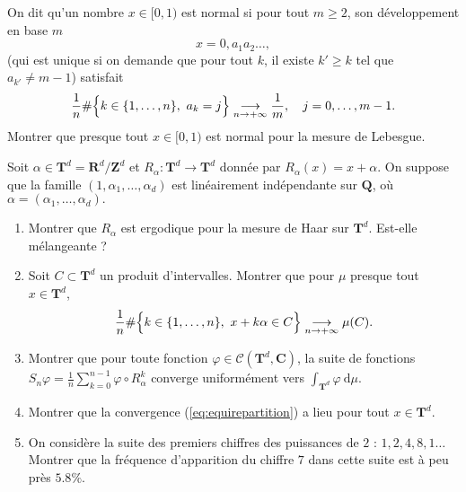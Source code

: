 \documentclass[a4paper,10pt,openany]{article}
\theoremstyle{plain}
\theoremstyle{definition}
\newcommand{\dd}{\mathrm{d}}
\newcommand{\T}{\mathbf{T}}
\newcommand{\R}{\mathbf{R}}
\newcommand{\Q}{\mathbf{Q}}
\newcommand{\Z}{\mathbf{Z}}
\newcommand{\C}{\mathbf{C}}
\begin{document}
\vspace{0.6cm}

 \vspace{1.5mm} 

\noindent On dit qu'un nombre $x \in [0,1)$ est normal si pour tout $m \geq 2$, son d\'eveloppement en base $m$
$$
x = 0,a_1a_2\dots,
$$
(qui est unique si on demande que pour tout $k$, il existe $k' \geq k$ tel que $a_{k'} \neq m-1$) satisfait
$$
\frac{1}{n} \#\Bigl\{k \in \{1, \dots, n\},~a_k = j\Bigr\} \underset{n \to +\infty}{\longrightarrow} \frac{1}{m}, \quad j = 0, \dots, m-1.
$$
Montrer que presque tout $x \in [0,1)$ est normal pour la mesure de Lebesgue.

\vspace{0.6cm}


 \vspace{1.5mm} 

\noindent Soit $\alpha \in \T^d = \R^d/ \Z^d$ et $R_\alpha : \T^d \to \T^d$ donn\'ee par $R_\alpha(x) = x + \alpha.$ On suppose que la famille $(1, \alpha_1, \dots, \alpha_d)$ est lin\'eairement ind\'ependante sur $\Q$, o\`u $\alpha = (\alpha_1, \dots, \alpha_d).$
\begin{enumerate}
\item Montrer que $R_\alpha$ est ergodique pour la mesure de Haar sur $\T^d$. Est-elle m\'elangeante ?
\item Soit $C \subset \T^d$ un produit d'intervalles. Montrer que pour $\mu$ presque tout $x \in \T^d$, 
\begin{equation}\label{eq:equirepartition}
\frac{1}{n} \#\Bigl\{k \in \{1, \dots, n\},~x + k\alpha \in C \Bigr\} \underset{n \to +\infty}{\longrightarrow} \mu(C).
\end{equation}
\item Montrer que pour toute fonction $\varphi \in \mathcal{C}(\T^d, \C)$, la suite de fonctions $S_n \varphi = \displaystyle{\frac{1}{n}\sum_{k=0}^{n-1}} \varphi \circ R_\alpha^k$ converge uniform\'ement vers $\int_{\T^d} \varphi ~\dd \mu.$
\item Montrer que la convergence (\ref{eq:equirepartition}) a lieu pour tout $x \in \T^d$.
\item On consid\`ere la suite des premiers chiffres des puissances de $2$ : $1, 2, 4, 8, 1 \dots$ Montrer que la fr\'equence d'apparition du chiffre $7$ dans cette suite est \`a peu pr\`es $5.8\%$.
\end{enumerate}
\end{document}
